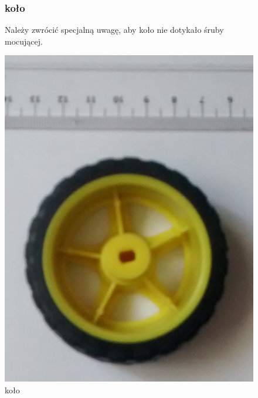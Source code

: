 \documentclass[a4paper,11pt]{article}
\def\SCALE{0.6}
\begin{document}
\begin{figure}[H]
	\subsubsection{koło}
	Należy zwrócić specjalną uwagę, aby koło nie dotykało śruby mocującej.

	\centering
	\includegraphics[width=\SCALE
	\paperwidth]{kolo}
	\caption{koło}
\end{figure}
\end{document}
